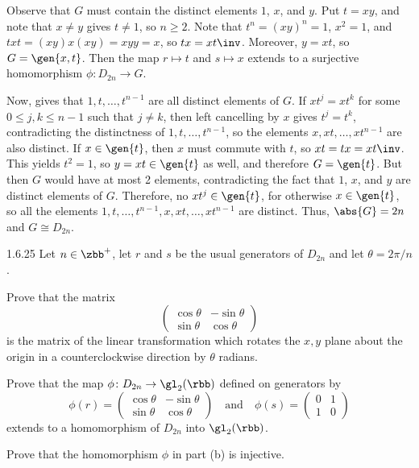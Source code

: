 \begin{sol}
    Observe that $G$ must contain the distinct elements $1$, $x$, and $y$.
    Put $t = xy$, and note that $x \neq y$ gives $t \neq 1$, so $n \geq 2$.
    Note that $t^n = (xy)^n = 1$, $x^2 = 1$, and $txt = (xy)x(xy) = xyy = x$, so $tx = xt\inv$.
    Moreover, $y = xt$, so $G = \gen{x, t}$.
    Then the map $r \mapsto t$ and $s \mapsto x$ extends to a surjective homomorphism $\phi \colon D_{2n} \to G$.

    Now,  gives that $1, t, \ldots, t^{n-1}$ are all distinct elements of $G$.
    If $xt^j = xt^k$ for some $0 \leq j, k \leq n-1$ such that $j \neq k$, then left cancelling by $x$ gives $t^j = t^k$, contradicting the distinctness of $1, t, \ldots, t^{n-1}$, so the elements $x, xt, \ldots, xt^{n-1}$ are also distinct.
    If $x \in \gen{t}$, then $x$ must commute with $t$, so $xt = tx = xt\inv$.
    This yields $t^2 = 1$, so $y = xt \in \gen{t}$ as well, and therefore $G = \gen{t}$.
    But then $G$ would have at most 2 elements, contradicting the fact that $1$, $x$, and $y$ are distinct elements of $G$.
    Therefore, no $xt^j \in \gen{t}$, for otherwise $x \in \gen{t}$, so all the elements $1, t, \ldots, t^{n-1}, x, xt, \ldots, xt^{n-1}$ are distinct.
    Thus, $\abs{G} = 2n$ and $G \cong D_{2n}$.
\end{sol}

\begin{exercise}{1.6.25}
    Let $n \in \zbb^+$, let $r$ and $s$ be the usual generators of $D_{2n}$ and let $\theta = 2\pi / n$.
    \begin{subexercises}
        \item Prove that the matrix 
        \[
            \begin{pmatrix}
                \cos \theta & -\sin \theta \\
                \sin \theta & \cos \theta
            \end{pmatrix}
        \]
        is the matrix of the linear transformation which rotates the $x,y$ plane about the origin in a counterclockwise direction by $\theta$ radians.
        \item Prove that the map $\phi \colon D_{2n} \to \gl_2(\rbb)$ defined on generators by
        \[
            \phi(r) = 
            \begin{pmatrix}
                \cos \theta & -\sin \theta \\
                \sin \theta & \cos \theta
            \end{pmatrix}
            \quad \text{and} \quad
            \phi(s) = 
            \begin{pmatrix}
                0 & 1 \\
                1 & 0
            \end{pmatrix}
        \]
        extends to a homomorphism of $D_{2n}$ into $\gl_2(\rbb)$.
        \item Prove that the homomorphism $\phi$ in part (b) is injective.
    \end{subexercises}
\end{exercise}


